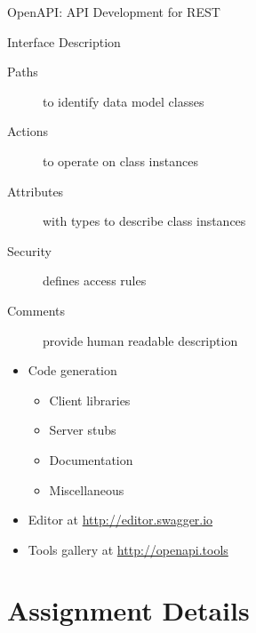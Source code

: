 \begin{frame}{OpenAPI: API Development for REST}
    \begin{block}{Interface Description}
        \begin{description}
            \item[Paths] to identify data model classes
            \item[Actions] to operate on class instances
            \item[Attributes] with types to describe class instances
            \item[Security] defines access rules
            \item[Comments] provide human readable description
        \end{description}
    \end{block}

    \medskip

    \begin{itemize}
        \item Code generation
        \begin{itemize}
            \item Client libraries
            \item Server stubs
            \item Documentation
            \item Miscellaneous
        \end{itemize}
        \item Editor at \url{http://editor.swagger.io}
        \item Tools gallery at \url{http://openapi.tools}
    \end{itemize}
\end{frame}


\section{Assignment Details}


